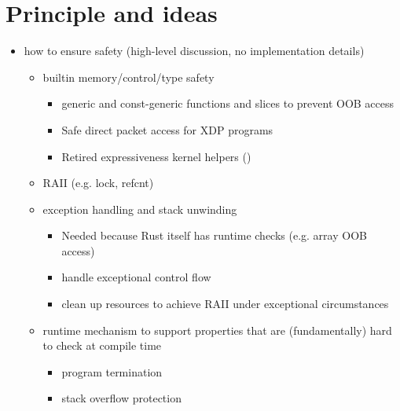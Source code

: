 \section{Principle and ideas}

\begin{itemize}
    \item how to ensure safety (high-level discussion, no implementation
        details)
        \begin{itemize}
            \item builtin memory/control/type safety
                \begin{itemize}
                    \item generic and const-generic functions and slices to
                        prevent OOB access
                    \item Safe direct packet access for XDP programs
                    \item Retired expressiveness kernel helpers ()
                \end{itemize}
            \item RAII (e.g. lock, refcnt)
            \item exception handling and stack unwinding
                \begin{itemize}
                    \item Needed because Rust itself has runtime checks (e.g.
                        array OOB access)
                    \item handle exceptional control flow
                    \item clean up resources to achieve RAII under exceptional
                        circumstances
                \end{itemize}
            \item runtime mechanism to support properties that are
                (fundamentally) hard to check at compile time
                \begin{itemize}
                    \item program termination
                    \item stack overflow protection
                \end{itemize}
        \end{itemize}
\end{itemize}

